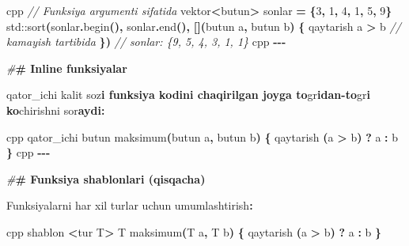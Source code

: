 \documentclass[a4paper,11pt,twoside,openright]{book}
\newenvironment{Shaded}{\begin{snugshade}}{\end{snugshade}}
\newcommand{\BuiltInTok}[1]{#1}
\newcommand{\CharTok}[1]{\textcolor[rgb]{0.31,0.60,0.02}{#1}}
\newcommand{\CommentTok}[1]{\textcolor[rgb]{0.56,0.35,0.01}{\textit{#1}}}
\newcommand{\DecValTok}[1]{\textcolor[rgb]{0.00,0.00,0.81}{#1}}
\newcommand{\ErrorTok}[1]{\textcolor[rgb]{0.64,0.00,0.00}{\textbf{#1}}}
\newcommand{\NormalTok}[1]{#1}
\newcommand{\OperatorTok}[1]{\textcolor[rgb]{0.81,0.36,0.00}{\textbf{#1}}}
\newcommand{\PreprocessorTok}[1]{\textcolor[rgb]{0.56,0.35,0.01}{\textit{#1}}}
\begin{document}
\begin{Shaded}
\begin{Highlighting}[]
\ErrorTok{\textasciigrave{}\textasciigrave{}\textasciigrave{}}\NormalTok{cpp}
\CommentTok{// Funksiya argumenti sifatida}
\NormalTok{vektor}\OperatorTok{\textless{}}\NormalTok{butun}\OperatorTok{\textgreater{}}\NormalTok{ sonlar }\OperatorTok{=} \OperatorTok{\{}\DecValTok{3}\OperatorTok{,} \DecValTok{1}\OperatorTok{,} \DecValTok{4}\OperatorTok{,} \DecValTok{1}\OperatorTok{,} \DecValTok{5}\OperatorTok{,} \DecValTok{9}\OperatorTok{\}}
\BuiltInTok{std::}\NormalTok{sort}\OperatorTok{(}\NormalTok{sonlar}\OperatorTok{.}\NormalTok{begin}\OperatorTok{(),}\NormalTok{ sonlar}\OperatorTok{.}\NormalTok{end}\OperatorTok{(),} \OperatorTok{[](}\NormalTok{butun a}\OperatorTok{,}\NormalTok{ butun b}\OperatorTok{)} \OperatorTok{\{}
\NormalTok{    qaytarish a }\OperatorTok{\textgreater{}}\NormalTok{ b   }\CommentTok{// kamayish tartibida}
\OperatorTok{\})}
\CommentTok{// sonlar: \{9, 5, 4, 3, 1, 1\}}
\ErrorTok{\textasciigrave{}\textasciigrave{}\textasciigrave{}}\NormalTok{cpp}
\OperatorTok{{-}{-}{-}}

\PreprocessorTok{\#}\ErrorTok{\# Inline funksiyalar}

\ErrorTok{\textasciigrave{}}\NormalTok{qator\_ichi}\ErrorTok{\textasciigrave{}}\NormalTok{ kalit so}\CharTok{\textquotesingle{}z}\ErrorTok{i funksiya kodini chaqirilgan joyga to}\CharTok{\textquotesingle{}}\NormalTok{g}\CharTok{\textquotesingle{}r}\ErrorTok{idan{-}to}\CharTok{\textquotesingle{}}\NormalTok{g}\CharTok{\textquotesingle{}r}\ErrorTok{i ko}\CharTok{\textquotesingle{}}\NormalTok{chirishni so}\CharTok{\textquotesingle{}r}\ErrorTok{aydi:}

\ErrorTok{\textasciigrave{}\textasciigrave{}\textasciigrave{}}\NormalTok{cpp}
\NormalTok{qator\_ichi butun maksimum}\OperatorTok{(}\NormalTok{butun a}\OperatorTok{,}\NormalTok{ butun b}\OperatorTok{)} \OperatorTok{\{}
\NormalTok{    qaytarish }\OperatorTok{(}\NormalTok{a }\OperatorTok{\textgreater{}}\NormalTok{ b}\OperatorTok{)} \OperatorTok{?}\NormalTok{ a }\OperatorTok{:}\NormalTok{ b}
\OperatorTok{\}}
\ErrorTok{\textasciigrave{}\textasciigrave{}\textasciigrave{}}\NormalTok{cpp}
\OperatorTok{{-}{-}{-}}

\PreprocessorTok{\#}\ErrorTok{\# Funksiya shablonlari (qisqacha)}

\NormalTok{Funksiyalarni har xil turlar uchun umumlashtirish}\OperatorTok{:}

\ErrorTok{\textasciigrave{}\textasciigrave{}\textasciigrave{}}\NormalTok{cpp}
\NormalTok{shablon }\OperatorTok{\textless{}}\NormalTok{tur T}\OperatorTok{\textgreater{}}
\NormalTok{T maksimum}\OperatorTok{(}\NormalTok{T a}\OperatorTok{,}\NormalTok{ T b}\OperatorTok{)} \OperatorTok{\{}
\NormalTok{    qaytarish }\OperatorTok{(}\NormalTok{a }\OperatorTok{\textgreater{}}\NormalTok{ b}\OperatorTok{)} \OperatorTok{?}\NormalTok{ a }\OperatorTok{:}\NormalTok{ b}
\OperatorTok{\}}


\end{Highlighting}
\end{Shaded}
\end{document}
